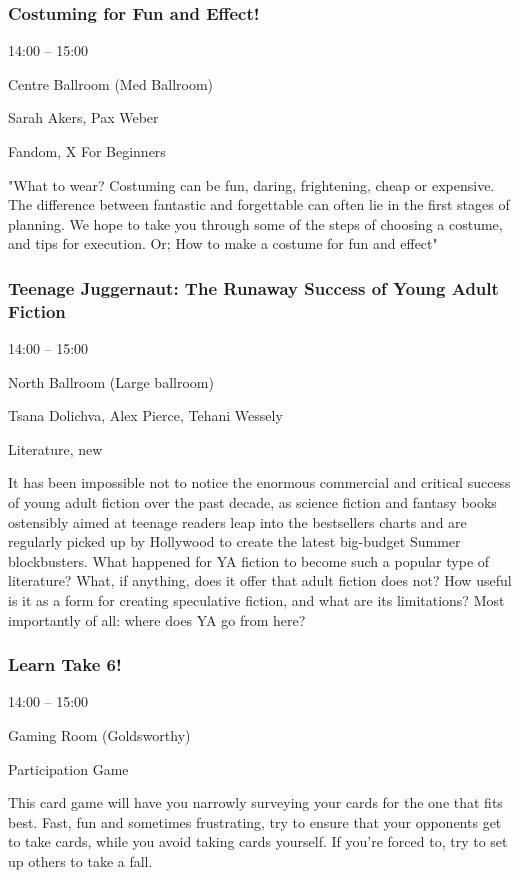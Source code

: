 \documentclass{scrreprt}
\begin{document}
\begin{multicols}{2}
\subsubsection*{Costuming for Fun and Effect!}\begin{description}
\setlength{\itemsep}{0pt}
\setlength{\parsep}{0pt}
\setlength{\parskip}{0pt}
\item[Time:]{14:00 -- 15:00}
\item[Venue:]{Centre Ballroom (Med Ballroom)}
\item[People:]{Sarah Akers, Pax Weber}
\item[Tags:]{Fandom, X For Beginners}\end{description}
"What to wear? Costuming can be fun, daring, frightening, cheap or expensive. The difference between fantastic and forgettable can often lie in the first stages of planning. We hope to take you through some of the steps of choosing a costume, and tips for execution. Or; How to make a costume for fun and effect"
\subsubsection*{Teenage Juggernaut: The Runaway Success of Young Adult Fiction}\begin{description}
\setlength{\itemsep}{0pt}
\setlength{\parsep}{0pt}
\setlength{\parskip}{0pt}
\item[Time:]{14:00 -- 15:00}
\item[Venue:]{North Ballroom (Large ballroom)}
\item[People:]{Tsana Dolichva, Alex Pierce, Tehani Wessely}
\item[Tags:]{Literature, new}\end{description}
It has been impossible not to notice the enormous commercial and critical success of young adult fiction over the past decade, as science fiction and fantasy books ostensibly aimed at teenage readers leap into the bestsellers charts and are regularly picked up by Hollywood to create the latest big-budget Summer blockbusters. What happened for YA fiction to become such a popular type of literature? What, if anything, does it offer that adult fiction does not? How useful is it as a form for creating speculative fiction, and what are its limitations? Most importantly of all: where does YA go from here?
\subsubsection*{Learn Take 6!}\begin{description}
\setlength{\itemsep}{0pt}
\setlength{\parsep}{0pt}
\setlength{\parskip}{0pt}
\item[Time:]{14:00 -- 15:00}
\item[Venue:]{Gaming Room (Goldsworthy)}
\item[Tags:]{Participation Game}\end{description}
This card game will have you narrowly surveying your cards for the one that fits best. Fast, fun and sometimes frustrating, try to ensure that your opponents get to take cards, while you avoid taking cards yourself. If you're forced to, try to set up others to take a fall.

\end{multicols}
\end{document}
